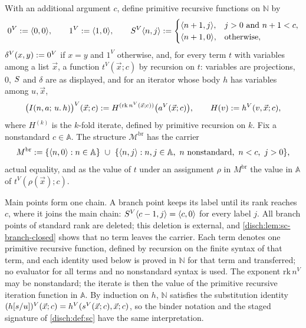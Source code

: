 \begin{definition}
\label{disch:def:sc-branch}
With an additional argument $c$, define primitive recursive functions on
$\mathbb N$ by
\[
 0^V\mathrel{:=}\langle 0,0\rangle,\qquad 1^V\mathrel{:=}\langle 1,0\rangle,\qquad
 S^V\langle n,j\rangle\mathrel{:=}
 \begin{cases}
  \langle n+1,j\rangle, & j>0\text{ and }n+1<c,\\
  \langle n+1,0\rangle, & \text{otherwise},
 \end{cases}
\]
$\delta^V(x,y)\mathrel{:=} 0^V$ if $x=y$ and $1^V$ otherwise, and, for every term
$t$ with variables among a list $\vec x$, a function $t^V(\vec x;c)$ by
recursion on $t$: variables are projections, $0$, $S$ and $\delta$ are as
displayed, and for an iterator whose body $h$ has variables among
$u,\vec x$,
\[
 \bigl(I(n,a;\,u.\,h)\bigr)^V(\vec x;c)\mathrel{:=}
 H^{(\mathrm{rk}\,n^V(\vec x;c))}\bigl(a^V(\vec x;c)\bigr),\qquad
 H(v)\mathrel{:=} h^V(v,\vec x;c),
\]
where $H^{(k)}$ is the $k$-fold iterate, defined by primitive recursion on
$k$. Fix a nonstandard $c\in\mathbb A$. The structure
$\mathcal M^{\mathrm{br}}$ has the carrier
\[
 M^{\mathrm{br}}\defeq\{\langle n,0\rangle:n\in\mathbb A\}\ \cup\
 \{\langle n,j\rangle: n,j\in\mathbb A,\ n\text{ nonstandard},\ n<c,\ j>0\},
\]
actual equality, and as the value of $t$ under an assignment $\rho$ in
$M^{\mathrm{br}}$ the value in $\mathbb A$ of $t^V(\rho(\vec x);c)$.
\end{definition}

Main points form one chain. A branch point keeps its label until its rank
reaches $c$, where it joins the main chain: $S^V\langle c-1,j\rangle=
\langle c,0\rangle$ for every label $j$. All branch points of standard rank
are deleted; this deletion is external, and
\cref{disch:lem:sc-branch-closed} shows that no term leaves the carrier.
Each term denotes one primitive recursive function, defined by recursion on
the finite syntax of that term, and each identity used below is proved in
$\mathbb N$ for that term and transferred; no evaluator for all terms and no
nonstandard syntax is used. The exponent $\mathrm{rk}\,n^V$ may be
nonstandard; the iterate is then the value of the primitive recursive
iteration function in $\mathbb A$. By induction on $h$, $\mathbb N$
satisfies the substitution identity
$(h[s/u])^V(\vec x;c)=h^V(s^V(\vec x;c),\vec x;c)$, so the binder
notation and the staged signature of \cref{disch:def:sc} have the same
interpretation.

